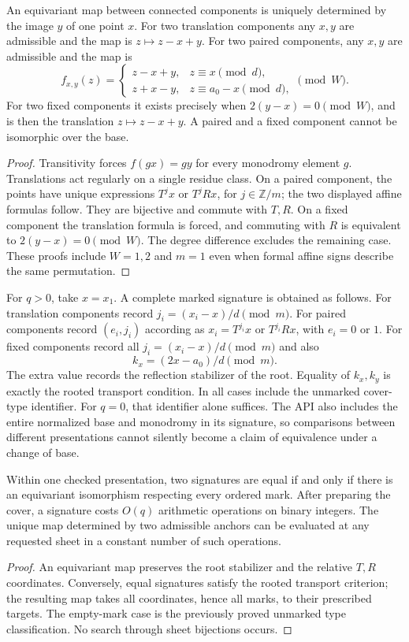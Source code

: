 \begin{proposition}
An equivariant map between connected components is uniquely determined by
the image $y$ of one point $x$.  For two translation components any $x,y$
are admissible and the map is $z\mapsto z-x+y$.  For two paired components,
any $x,y$ are admissible and the map is
\[
 f_{x,y}(z)=
 \begin{cases}
 z-x+y,&z\equiv x\pmod d,\\
 z+x-y,&z\equiv a_0-x\pmod d,
 \end{cases}\pmod W.
\]
For two fixed components it exists precisely when
$2(y-x)=0\pmod W$, and is then the translation $z\mapsto z-x+y$.
A paired and a fixed component cannot be isomorphic over the base.
\end{proposition}
\begin{proof}
Transitivity forces $f(gx)=gy$ for every monodromy element $g$.
Translations act regularly on a single residue class.  On a paired
component, the points have unique expressions $T^j x$ or $T^jRx$, for
$j\in\mathbb Z/m$; the two displayed affine formulas follow.  They are
bijective and commute with $T,R$.  On a fixed component the translation
formula is forced, and commuting with $R$ is equivalent to
$2(y-x)=0\pmod W$.  The degree difference excludes the remaining case.
These proofs include $W=1,2$ and $m=1$ even when formal affine signs
describe the same permutation.
\end{proof}

For $q>0$, take $x=x_1$.  A complete marked signature is obtained as follows.
For translation components record $j_i=(x_i-x)/d\pmod m$.
For paired components record $(e_i,j_i)$ according as
$x_i=T^{j_i}x$ or $T^{j_i}Rx$, with $e_i=0$ or $1$.
For fixed components record all $j_i=(x_i-x)/d\pmod m$ and also
\[
 k_x=(2x-a_0)/d\pmod m.
\]
The extra value records the reflection stabilizer of the root.  Equality
of $k_x,k_y$ is exactly the rooted transport condition.  In all cases
include the unmarked cover-type identifier.  For $q=0$, that identifier
alone suffices.  The API also includes the entire normalized base and
monodromy in its signature, so comparisons between different presentations
cannot silently become a claim of equivalence under a change of base.

\begin{corollary}
Within one checked presentation, two signatures are equal if and only if
there is an equivariant isomorphism respecting every ordered mark.
After preparing the cover, a signature costs $O(q)$ arithmetic operations
on binary integers.  The unique map determined by two admissible anchors
can be evaluated at any requested sheet in a constant number of such
operations.
\end{corollary}
\begin{proof}
An equivariant map preserves the root stabilizer and the relative $T,R$
coordinates.  Conversely, equal signatures satisfy the rooted transport
criterion; the resulting map takes all coordinates, hence all marks, to
their prescribed targets.  The empty-mark case is the previously proved
unmarked type classification.  No search through sheet bijections occurs.
\end{proof}

